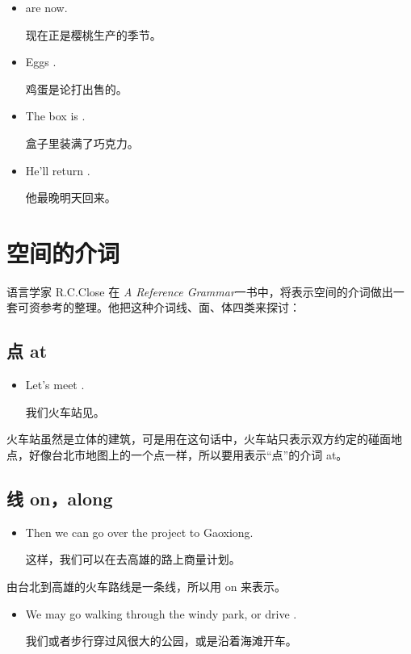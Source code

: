 \begin{itemize}
\item {} are  now.

  现在正是樱桃生产的季节。
\item Eggs  .

  鸡蛋是论打出售的。
\item The box is  .

  盒子里装满了巧克力。
\item He'll return  .

  他最晚明天回来。
\end{itemize}

\section{空间的介词}

语言学家 R.C.Close 在 \textit{A Reference Grammar}一书中，将表示空间的介词做出一
套可资参考的整理。他把这种介词线、面、体四类来探讨：

\subsection{点 at}

\begin{itemize}
\item Let's meet .

  我们火车站见。
\end{itemize}
火车站虽然是立体的建筑，可是用在这句话中，火车站只表示双方约定的碰面地点，好像台北市地图上的一个点一样，所以要用表示“点”的介词
at。

\subsection{线 on，along}

\begin{itemize}
\item Then we can go over the project  to Gaoxiong.

  这样，我们可以在去高雄的路上商量计划。
\end{itemize}
由台北到高雄的火车路线是一条线，所以用 on 来表示。


\begin{itemize}
\item  We may go walking through the windy park, or drive .

  我们或者步行穿过风很大的公园，或是沿着海滩开车。
\end{itemize}

